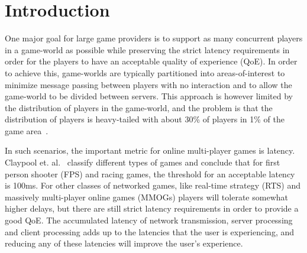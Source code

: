 \section{Introduction}




One major goal for large game providers is to support as many
concurrent players in a game-world as possible while preserving the
strict latency requirements in order for the players to have an
acceptable quality of experience (QoE). In order to achieve this,
game-worlds are typically partitioned into areas-of-interest to
minimize message passing between players with no interaction and to
allow the game-world to be divided between servers. This approach is
however limited by the distribution of players in the game-world, and
the problem is that the distribution of players is heavy-tailed with
about 30\% of players in 1\% of the game area~\cite{chen-2006}. 

In such scenarios, the important metric for online multi-player games
is latency. Claypool et. al.~\cite{claypool++-2006} classify different
types of games and conclude that for first person shooter (FPS) and
racing games, the threshold for an acceptable latency is 100ms. For
other classes of networked games, like real-time strategy (RTS) and
massively multi-player online games (MMOGs) players will tolerate
somewhat higher delays, but there are still strict latency
requirements in order to provide a good QoE. The accumulated latency
of network transmission, server processing and client processing adds
up to the latencies that the user is experiencing, and reducing any of
these latencies will improve the user's experience.

